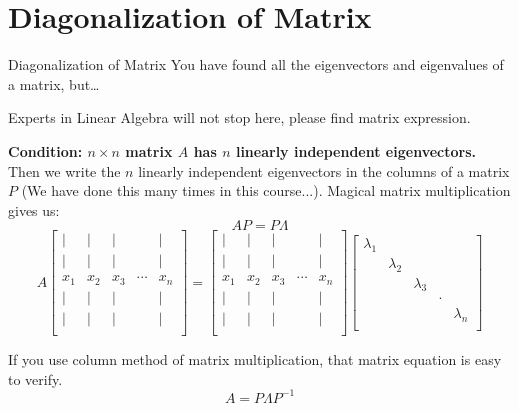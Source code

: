 \documentclass{beamer}
\begin{document}
\section{Diagonalization of Matrix}
\begin{frame}{Diagonalization of Matrix}
You have found all the eigenvectors and eigenvalues of a matrix, but\dots

\vspace{3pt}
Experts in Linear Algebra will not stop here, please find matrix expression.

\vspace{3pt}
\textbf{Condition: $n\times n$ matrix $A$ has $n$ linearly independent eigenvectors.} Then we write the $n$ linearly independent eigenvectors in the columns of a matrix $P$ (We have done this many times in this course...). Magical matrix multiplication gives us:
\begin{equation*}
    AP=P\varLambda
\end{equation*}
\begin{equation*}
    A\left[ \begin{matrix}
        |&		|&		|&		&		|\\
        |&		|&		|&		&		|\\
        x_1&		x_2&		x_3&		\cdots&		x_n\\
        |&		|&		|&		&		|\\
        |&		|&		|&		&		|\\
    \end{matrix} \right] =\left[ \begin{matrix}
        |&		|&		|&		&		|\\
        |&		|&		|&		&		|\\
        x_1&		x_2&		x_3&		\cdots&		x_n\\
        |&		|&		|&		&		|\\
        |&		|&		|&		&		|\\
    \end{matrix} \right] \left[ \begin{matrix}
        \lambda _1&		&		&		&		\\
        &		\lambda _2&		&		&		\\
        &		&		\lambda _3&		&		\\
        &		&		&		\cdot&		\\
        &		&		&		&		\lambda _n\\
    \end{matrix} \right]
\end{equation*}

If you use column method of matrix multiplication, that matrix equation is easy to verify.
\begin{equation*}
    A=P\varLambda P^{-1}
\end{equation*}
\end{frame}
\end{document}

